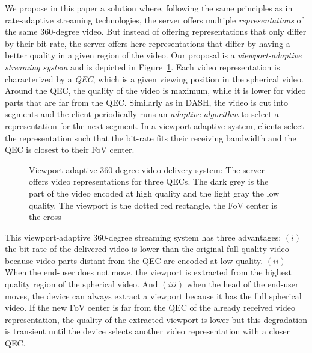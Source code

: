 We propose in this paper a solution where, following the same
principles as in rate-adaptive streaming technologies, the server
offers multiple \emph{representations} of the same 360-degree video.
But instead of offering representations that only differ by their
bit-rate, the server offers here representations that differ by having
a better quality in a given region of the video. Our proposal is a
\emph{viewport-adaptive streaming system} and is depicted in
Figure~\ref{fig:deliverychain}. Each video representation is characterized
by a \emph{\ac{QEC}}, which is a given viewing position in the
spherical video. Around the \ac{QEC}, the quality of the video is
maximum, while it is lower for video parts that are far from the
\ac{QEC}. Similarly as in \ac{DASH}, the video is cut into segments
and the client periodically runs an \emph{adaptive algorithm} to
select a representation for the next segment. In a
viewport-adaptive system, clients select the representation
such that the bit-rate fits their receiving
bandwidth and the \ac{QEC} is closest to their \ac{FoV} center.

\setlength{\textfloatsep}{12pt}
\setlength{\intextsep}{9pt}
\begin{figure}%

   \centering
   
   \caption{Viewport-adaptive 360-degree video delivery system: The server
   offers video representations for three \acp{QEC}. The dark grey is the part of the video encoded at high quality and the light
   gray the low quality. The viewport is the dotted red rectangle, the \ac{FoV} center is the
   cross}
   \label{fig:deliverychain}
\end{figure}

This viewport-adaptive 360-degree streaming system has three
advantages: $(i)$ the bit-rate of the delivered video is lower than
the original full-quality video because video parts distant from the
\ac{QEC} are encoded at low quality. $(ii)$ When the end-user does not
move, the viewport is extracted from the highest quality region of the
spherical video. And $(iii)$ when the head of the end-user moves, the
device can always extract a viewport because it has the full
spherical video. If the new \ac{FoV} center is far from the \ac{QEC}
of the already received video representation, the quality of the
extracted viewport is lower but this degradation is transient until the
device selects another video representation with a closer \ac{QEC}.

